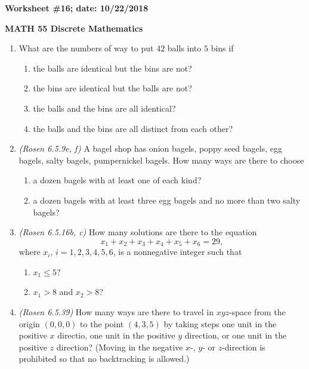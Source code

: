 \documentclass{article}
\begin{document}
{\bf Worksheet \#16; date: 10/22/2018}

{\bf MATH 55 Discrete Mathematics}

\begin{enumerate}
\item What are the numbers of way to put $42$ balls into $5$ bins if
\begin{enumerate}
\item the balls are identical but the bins are not?
\item the bins are identical but the balls are not?
\item the balls and the bins are all identical?
\item the balls and the bins are all distinct from each other?
\end{enumerate}

\item {\em (Rosen 6.5.9e, f)} A bagel shop has onion bagels, poppy seed bagels, egg bagels, salty bagels, pumpernickel bagels. How many ways are there to choose
\begin{enumerate}
\item a dozen bagels with at least one of each kind?
\item a dozen bagels with at least three egg bagels and no more than two salty bagels?
\end{enumerate}

\item {\em (Rosen 6.5.16b, c)} How many solutions are there to the equation
\[
x_1 + x_2 + x_3 + x_4 + x_5 + x_6 = 29,
\]
where $x_i$, $i = 1, 2, 3, 4, 5, 6$, is a nonnegative integer such that
\begin{enumerate}
\item $x_1 \le 5$?
\item $x_1 > 8$ and $x_2 > 8$?
\end{enumerate}

\item {\em (Rosen 6.5.39)} How many ways are there to travel in $xyz$-space from the origin $(0, 0, 0)$ to the point $(4, 3, 5)$ by taking steps one unit in the positive $x$ directio, one unit in the positive $y$ direction, or one unit in the positive $z$ direction? (Moving in the negative $x$-, $y$- or $z$-direction is prohibited so that no backtracking is allowed.)
\end{enumerate}
\end{document}
